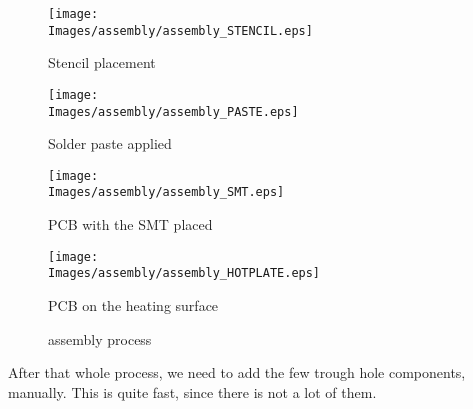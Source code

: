 \begin{figure}[!hbt]
    \centering
    \begin{minipage}[c]{\SmallSchematicWidth}
        \centering
        \texttt{[image: \\Images/assembly/assembly\_STENCIL.eps]}
        \caption*{Stencil placement}
    \end{minipage}%
    \hfill%
    \begin{minipage}[c]{\SmallSchematicWidth}
        \centering
        \texttt{[image: \\Images/assembly/assembly\_PASTE.eps]}
        \caption*{Solder paste applied}
    \end{minipage}%
    \hfill%
    \begin{minipage}[c]{\SmallSchematicWidth}
        \centering
        \texttt{[image: \\Images/assembly/assembly\_SMT.eps]}
        \caption*{PCB with the SMT placed}
    \end{minipage}%
    \hfill%
    \begin{minipage}[c]{\SmallSchematicWidth}
        \centering
        \texttt{[image: \\Images/assembly/assembly\_HOTPLATE.eps]}
        \caption*{PCB on the heating surface}
    \end{minipage}
    \label{img:assembly}
    \caption{assembly process}
\end{figure}
\FloatBarrier

After that whole process, we need to add the few trough hole components, manually.
This is quite fast, since there is not a lot of them.